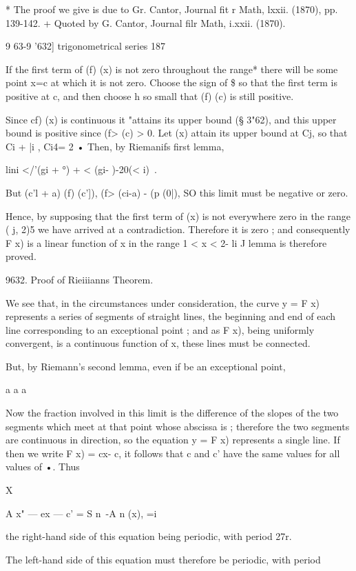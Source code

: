 {* The proof we give is due to Gr. Cantor, Journal fit r Math, lxxii.
(1870), pp. 139-142. + Quoted by G. Cantor, Journal filr Math, i.xxii.
(1870).



9 63-9 '632] trigonometrical series 187

If the first term of (f) (x) is not zero throughout the range* there
will be some point x=c at which it is not zero. Choose the sign of \$
so that the first term is positive at c, and then choose h so small
that (f) (c) is still positive.

Since cf) (x) is continuous it "attains its upper bound (§ 3"62), and
this upper bound is positive since (f> (c) > 0. Let (x) attain its
upper bound at Cj, so that Ci + |i , Ci4= 2 • Then, by Riemanifs first
lemma,

lini </'(gi + °) + < (gi- )-20(< i)\ .

But (c'l + a) (f) (c']), (f> (ci-a) - (p (0|), SO this limit must be
negative or zero.

Hence, by supposing that the first term of (x) is not everywhere zero
in the range ( j, 2)5 we have arrived at a contradiction. Therefore it
is zero ; and consequently F x) is a linear function of x in the range
1 < x < 2- li J lemma is therefore proved.

9632. Proof of Rieiiianns Theorem.

We see that, in the circumstances under consideration, the curve y = F
x) represents a series of segments of straight lines, the beginning
and end of each line corresponding to an exceptional point ; and as F
x), being uniformly convergent, is a continuous function of x, these
lines must be connected.

But, by Riemann's second lemma, even if be an exceptional point,

a a a

Now the fraction involved in this limit is the difference of the
slopes of the two segments which meet at that point whose abscissa is
; therefore the two segments are continuous in direction, so the
equation y = F x) represents a single line. If then we write F x) =
cx- c, it follows that c and c' have the same values for all values of
•. Thus

X

 A x" — ex — c' = S n~-A n (x), =i

the right-hand side of this equation being periodic, with period 27r.

The left-hand side of this equation must therefore be periodic, with
period

}
